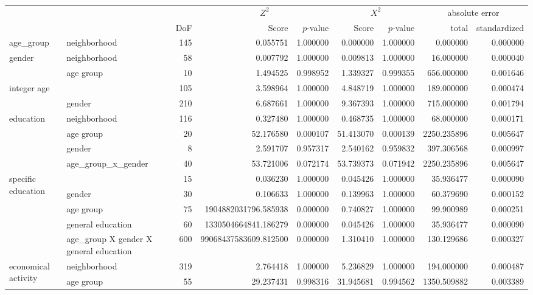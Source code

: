 \begin{tabular}{ll|r|rr|rr|rr}
\toprule
 &  &  & \multicolumn{2}{|c}{$Z^2$} & \multicolumn{2}{|c}{$X^2$} & \multicolumn{2}{|c}{absolute error} \\
 &  & DoF & Score & $p$-value & Score & $p$-value & total & standardized \\
\midrule
age_group & neighborhood & 145 & 0.055751 & 1.000000 & 0.000000 & 1.000000 & 0.000000 & 0.000000 \\
\cline{1-9}
\multirow[t]{2}{*}{gender} & neighborhood & 58 & 0.007792 & 1.000000 & 0.009813 & 1.000000 & 16.000000 & 0.000040 \\
 & age group & 10 & 1.494525 & 0.998952 & 1.339327 & 0.999355 & 656.000000 & 0.001646 \\
\cline{1-9}
\multirow[t]{2}{*}{integer age} &  & 105 & 3.598964 & 1.000000 & 4.848719 & 1.000000 & 189.000000 & 0.000474 \\
 & gender & 210 & 6.687661 & 1.000000 & 9.367393 & 1.000000 & 715.000000 & 0.001794 \\
\cline{1-9}
\multirow[t]{4}{*}{education} & neighborhood & 116 & 0.327480 & 1.000000 & 0.468735 & 1.000000 & 68.000000 & 0.000171 \\
 & age group & 20 & 52.176580 & 0.000107 & 51.413070 & 0.000139 & 2250.235896 & 0.005647 \\
 & gender & 8 & 2.591707 & 0.957317 & 2.540162 & 0.959832 & 397.306568 & 0.000997 \\
 & age_group_x_gender & 40 & 53.721006 & 0.072174 & 53.739373 & 0.071942 & 2250.235896 & 0.005647 \\
\cline{1-9}
\multirow[t]{5}{*}{specific education} &  & 15 & 0.036230 & 1.000000 & 0.045426 & 1.000000 & 35.936477 & 0.000090 \\
 & gender & 30 & 0.106633 & 1.000000 & 0.139963 & 1.000000 & 60.379690 & 0.000152 \\
 & age group & 75 & 1904882031796.585938 & 0.000000 & 0.740827 & 1.000000 & 99.900989 & 0.000251 \\
 & general education & 60 & 1330504664841.186279 & 0.000000 & 0.045426 & 1.000000 & 35.936477 & 0.000090 \\
 & age_group X gender X general education & 600 & 99068437583609.812500 & 0.000000 & 1.310410 & 1.000000 & 130.129686 & 0.000327 \\
\cline{1-9}
\multirow[t]{4}{*}{economical activity} & neighborhood & 319 & 2.764418 & 1.000000 & 5.236829 & 1.000000 & 194.000000 & 0.000487 \\
 & age group & 55 & 29.237431 & 0.998316 & 31.945681 & 0.994562 & 1350.509882 & 0.003389 \\

\end{tabular}
